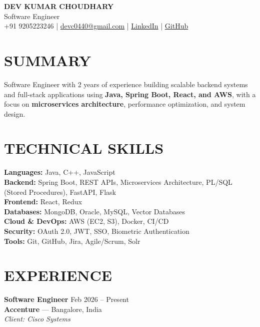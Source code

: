 \documentclass[a4paper,10.5pt]{article}
\begin{document}
{\LARGE\bfseries DEV KUMAR CHOUDHARY}\\
\vspace{2pt}
{\large Software Engineer}\\
\vspace{4pt}
\small
+91 9205223246 \;|\;
\href{mailto:devc0440@gmail.com}{devc0440@gmail.com} \;|\;
\href{https://linkedin.com/in/dev-choudhary-150551207}{LinkedIn} \;|\;
\href{https://github.com/920DEV}{GitHub}
\normalsize

\section*{SUMMARY}
Software Engineer with 2 years of experience building scalable backend systems and full-stack applications using \textbf{Java, Spring Boot, React, and AWS}, with a focus on \textbf{microservices architecture}, performance optimization, and system design.

\section*{TECHNICAL SKILLS}
\sffamily
\textbf{Languages:} Java, C++, JavaScript\\
\textbf{Backend:} Spring Boot, REST APIs, Microservices Architecture, PL/SQL (Stored Procedures), FastAPI, Flask\\
\textbf{Frontend:} React, Redux\\
\textbf{Databases:} MongoDB, Oracle, MySQL, Vector Databases\\
\textbf{Cloud \& DevOps:} AWS (EC2, S3), Docker, CI/CD\\
\textbf{Security:} OAuth 2.0, JWT, SSO, Biometric Authentication\\
\textbf{Tools:} Git, GitHub, Jira, Agile/Scrum, Solr
\rmfamily

\section*{EXPERIENCE}

\textbf{Software Engineer} \hfill Feb 2026 -- Present\\
\textbf{Accenture} — Bangalore, India\\
\textit{Client: Cisco Systems}
\end{document}
